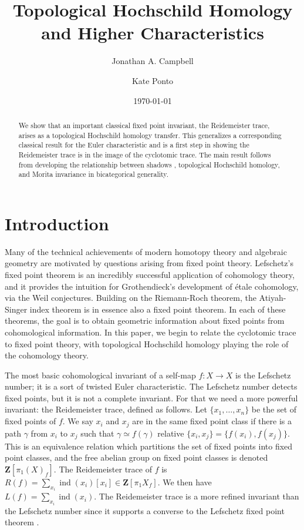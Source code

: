 \documentclass[11pt]{amsart}
\title{Topological Hochschild Homology and Higher Characteristics}
\date{\today}
\author{Jonathan A. Campbell}
\author{Kate Ponto}
\newcommand{\mbf}{\mathbf}
\begin{document}
\begin{abstract}
	We show that an important classical fixed point invariant, the Reidemeister trace, arises as a topological Hochschild homology transfer.  This generalizes a corresponding classical result for the Euler characteristic and is a first step in showing the Reidemeister trace is in the image of  the cyclotomic trace.  The main result follows from developing  the relationship between shadows \cite{p:thesis}, topological Hochschild homology, and Morita invariance in bicategorical generality. 
\end{abstract}
\maketitle

\setcounter{tocdepth}{1}
\tableofcontents

\section{Introduction}

Many of the technical achievements of modern homotopy theory and algebraic geometry are motivated by questions arising from   fixed point theory. Lefschetz's fixed point theorem is an incredibly successful application of cohomology theory, and it provides the intuition for Grothendieck's development of \'{e}tale cohomology, via the Weil conjectures.  Building on the Riemann-Roch theorem, the Atiyah-Singer index theorem \cite{atiyah_singer} is in essence also a fixed point theorem. In each of these theorems, the goal is to obtain geometric information about fixed points from cohomological information. In this paper, we begin to relate the cyclotomic trace to fixed point theory, with topological Hochschild homology playing the role of the cohomology theory. 

The most basic cohomological invariant of a self-map $f\colon X \to X$ is the Lefschetz number; it is a sort of twisted Euler characteristic.  The Lefschetz number detects fixed points, but it is not a complete invariant.   For that we need a more powerful invariant: the Reidemeister trace, defined as follows. Let $\{x_1, \dots, x_n\}$ be the set of fixed points of $f$. We say $x_i$ and $x_j$ are in the same fixed point class if there is a path $\gamma$ from $x_i$ to $x_j$ such that $\gamma \simeq f(\gamma)$ relative $\{x_i, x_j\} =\{f(x_i), f(x_j)\}$. This is an equivalence relation which partitions the set of fixed points into fixed point classes, and the free abelian group on fixed point classes is denoted $\mbf{Z}[\pi_1 (X)_f]$. The Reidemeister trace of $f$ is  $R(f) = \sum_{x_i} \operatorname{ind}(x_i) [x_i] \in \mbf{Z}[\pi_1 X_f].$ We then have $L(f) = \sum_{x_i} \operatorname{ind}(x_i)$. The Reidemeister trace is a more refined invariant than the Lefschetz number since it supports a converse to the Lefschetz fixed point theorem \cite{shi,wecken}.
\end{document}
